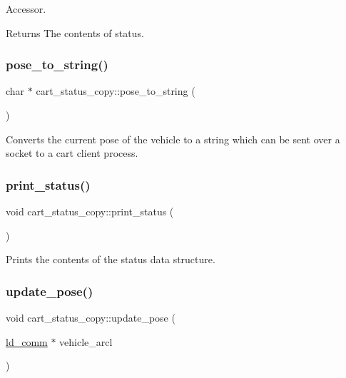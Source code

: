 Accessor. \begin{DoxyReturn}{Returns}
The contents of status. 
\end{DoxyReturn}
\mbox{\label{classcart__status__copy_a1b4788c35bb97d5447b0a7260a85c40d}} 
\subsubsection{\texorpdfstring{pose\+\_\+to\+\_\+string()}{pose\_to\_string()}}
{\footnotesize\ttfamily char $\ast$ cart\+\_\+status\+\_\+copy\+::pose\+\_\+to\+\_\+string (\begin{DoxyParamCaption}{ }\end{DoxyParamCaption})}

Converts the current pose of the vehicle to a string which can be sent over a socket to a cart client process. \mbox{\label{classcart__status__copy_a6a05f2781c3c5547b9f5fff2161b829f}} 
\subsubsection{\texorpdfstring{print\+\_\+status()}{print\_status()}}
{\footnotesize\ttfamily void cart\+\_\+status\+\_\+copy\+::print\+\_\+status (\begin{DoxyParamCaption}{ }\end{DoxyParamCaption})}

Prints the contents of the status data structure. \mbox{\label{classcart__status__copy_abc65e581df602a25f173e06ae5d453bf}} 
\subsubsection{\texorpdfstring{update\+\_\+pose()}{update\_pose()}\hspace{0.1cm}{\footnotesize\ttfamily [1/2]}}
{\footnotesize\ttfamily void cart\+\_\+status\+\_\+copy\+::update\+\_\+pose (\begin{DoxyParamCaption}\item[{\hyperlink{classld__comm}{ld\+\_\+comm} $\ast$}]{vehicle\+\_\+arcl }\end{DoxyParamCaption})}

